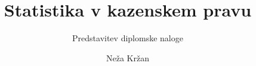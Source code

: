 \documentclass{beamer}
\begin{document}
\title{Statistika v kazenskem pravu}
\subtitle{Predstavitev diplomske naloge}
\author[Neža Kržan]{Neža Kržan}
 
\date[7. september 2023] {}

\subject{Talks}

\begin{frame}
   \titlepage
\end{frame}

\end{document}
